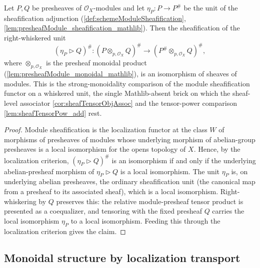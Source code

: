 \begin{lemma}

  \label{lem:isIso_sheafification_whiskerRight_unit}
  Let \(P, Q\) be presheaves of \(\mathcal{O}_X\)-modules and let
  \(\eta_P : P \to P^{\#}\) be the unit of the sheafification adjunction
  (\cref{def:schemeModuleSheafification},
  \cref{lem:presheafModule_sheafification_mathlib}). Then the sheafification of the
  right-whiskered unit
  \[
    (\eta_P \rhd Q)^{\#} :
      (P \otimes_{p,\mathcal{O}_X} Q)^{\#} \longrightarrow
      (P^{\#} \otimes_{p,\mathcal{O}_X} Q)^{\#},
  \]
  where \(\otimes_{p,\mathcal{O}_X}\) is the presheaf monoidal product
  (\cref{lem:presheafModule_monoidal_mathlib}), is an isomorphism of sheaves of
  modules. This is the strong-monoidality comparison of the module sheafification
  functor on a whiskered unit, the single Mathlib-absent brick on which the
  sheaf-level associator \cref{cor:sheafTensorObjAssoc} and the tensor-power
  comparison \cref{lem:sheafTensorPow_add} rest.
\end{lemma}

\begin{proof}
  \leanok
  Module sheafification is the localization functor at the class \(W\) of
  morphisms of presheaves of modules whose underlying morphism of abelian-group
  presheaves is a local isomorphism for the opens topology of \(X\). Hence, by the
  localization criterion, \((\eta_P \rhd Q)^{\#}\) is an isomorphism if and only if
  the underlying abelian-presheaf morphism of \(\eta_P \rhd Q\) is a local
  isomorphism. The unit \(\eta_P\) is, on underlying abelian presheaves, the
  ordinary sheafification unit (the canonical map from a presheaf to its associated sheaf), which is a local
  isomorphism. Right-whiskering by \(Q\) preserves this: the relative
  module-presheaf tensor product is presented as a coequalizer, and tensoring with
  the fixed presheaf \(Q\) carries the local isomorphism \(\eta_P\) to a local
  isomorphism. Feeding this through the localization criterion gives the claim.
\end{proof}

\subsection{Monoidal structure by localization transport}
\label{subsec:sgr_monoidal_localization}

